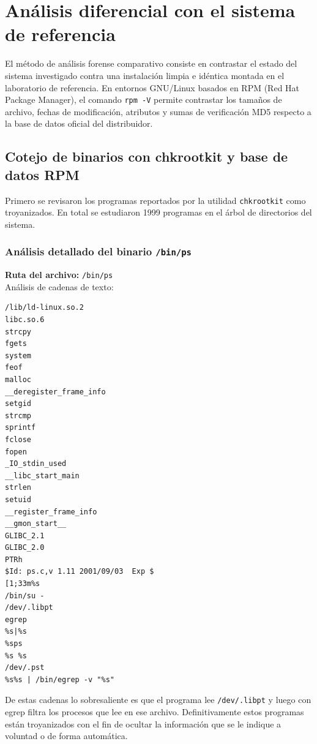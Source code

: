 \chapter{Análisis diferencial con el sistema de referencia}

El método de análisis forense comparativo consiste en contrastar el estado del sistema investigado contra una instalación limpia e idéntica montada en el laboratorio de referencia. En entornos GNU/Linux basados en RPM (Red Hat Package Manager), el comando \texttt{rpm -V} permite contrastar los tamaños de archivo, fechas de modificación, atributos y sumas de verificación MD5 respecto a la base de datos oficial del distribuidor.

\vspace{1em}



 \section{Cotejo de binarios con chkrootkit y base de datos RPM}

Primero se revisaron los programas reportados por la utilidad \texttt{chkrootkit} como
troyanizados. En total se estudiaron 1999 programas
en el árbol de directorios del sistema.\\

 \subsection{Análisis detallado del binario \texttt{/bin/ps}}

\noindent\textbf{Ruta del archivo:} \texttt{/bin/ps}\\
 
 Análisis de cadenas de texto:
 
 

\begin{lstlisting}[style=terminal]
/lib/ld-linux.so.2
libc.so.6
strcpy
fgets
system
feof
malloc
__deregister_frame_info
setgid
strcmp
sprintf
fclose
fopen
_IO_stdin_used
__libc_start_main
strlen
setuid
__register_frame_info
__gmon_start__
GLIBC_2.1
GLIBC_2.0
PTRh
$Id: ps.c,v 1.11 2001/09/03  Exp $
[1;33m%s
/bin/su -
/dev/.libpt
egrep
%s|%s
%sps
%s %s
/dev/.pst
%s%s | /bin/egrep -v "%s"
\end{lstlisting}

\vspace{1em}

 De estas cadenas lo sobresaliente es que el programa lee \texttt{/dev/.libpt}
y luego con egrep filtra los procesos que lee en ese
archivo. Definitivamente estos programas están troyanizados con el fin de
ocultar la información que se le indique a voluntad o de forma
automática.


